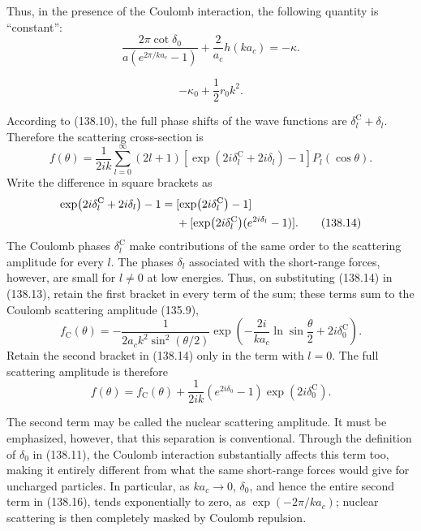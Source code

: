 Thus, in the presence of the Coulomb interaction, the following quantity is
``constant'':
\begin{equation}
 \frac{2\pi\cot\delta_0}{a(e^{2\pi/ka_c}-1)}
 +\frac2{a_c}h(ka_c)=-\kappa.
 \tag{138.12}
\end{equation}

\[
 -\kappa_0+\frac12r_0k^2.
\]



According to (138.10), the full phase shifts of the wave functions are
$\delta_l^{\mathrm C}+\delta_l$. Therefore the scattering cross-section is
\begin{equation}
 f(\theta)=\frac1{2ik}\sum_{l=0}^{\infty}(2l+1)
 [\exp(2i\delta_l^{\mathrm C}+2i\delta_l)-1]P_l(\cos\theta).
 \tag{138.13}
\end{equation}
Write the difference in square brackets as
\begin{align}
 \exp(2i\delta_l^{\mathrm C}+2i\delta_l)-1
 ={}&[\exp(2i\delta_l^{\mathrm C})-1]\notag\\
 &+[\exp(2i\delta_l^{\mathrm C})(e^{2i\delta_l}-1)].
 \tag{138.14}
\end{align}
The Coulomb phases $\delta_l^{\mathrm C}$ make contributions of the same
order to the scattering amplitude for every $l$. The phases $\delta_l$
associated with the short-range forces, however, are small for $l\ne0$ at
low energies. Thus, on substituting (138.14) in (138.13), retain the first
bracket in every term of the sum; these terms sum to the Coulomb scattering
amplitude (135.9),
\begin{equation}
 f_{\mathrm C}(\theta)=-\frac1{2a_ck^2\sin^2(\theta/2)}
 \exp\left(-\frac{2i}{ka_c}\ln\sin\frac\theta2+2i\delta_0^{\mathrm C}\right).
 \tag{138.15}
\end{equation}
Retain the second bracket in (138.14) only in the term with $l=0$. The full
scattering amplitude is therefore
\begin{equation}
 f(\theta)=f_{\mathrm C}(\theta)+\frac1{2ik}(e^{2i\delta_0}-1)
 \exp(2i\delta_0^{\mathrm C}).
 \tag{138.16}
\end{equation}

The second term may be called the nuclear scattering amplitude. It must be
emphasized, however, that this separation is conventional. Through the
definition of $\delta_0$ in (138.11), the Coulomb interaction substantially
affects this term too, making it entirely different from what the same
short-range forces would give for uncharged particles. In particular, as
$ka_c\to0$, $\delta_0$, and hence the entire second term in (138.16), tends
exponentially to zero, as $\exp(-2\pi/ka_c)$; nuclear scattering is then
completely masked by Coulomb repulsion.

